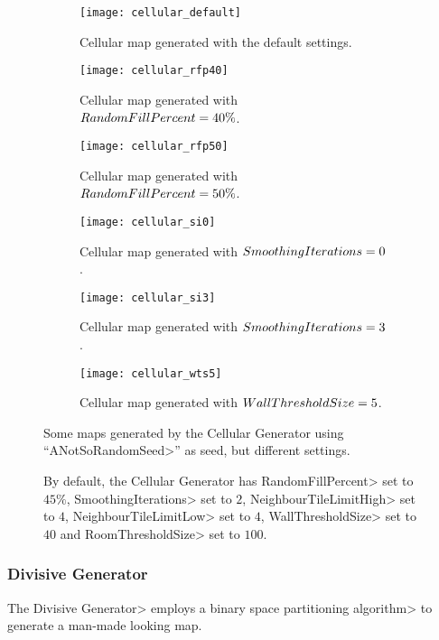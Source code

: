 \begin{figure}[tp]
	\centering
  	\begin{subfigure}[t]{0.325\linewidth}
		\texttt{[image: cellular\_default]}
     		\caption{Cellular map generated with the default settings.}
 	\end{subfigure}
  	\begin{subfigure}[t]{0.325\linewidth}
    		\texttt{[image: cellular\_rfp40]}
    		\caption{Cellular map generated with $Ran\-dom\-Fill\-Per\-cent = 40\%$.}
  	\end{subfigure}
  	\begin{subfigure}[t]{0.325\linewidth}
    		\texttt{[image: cellular\_rfp50]}
    		\caption{Cellular map generated with $Ran\-dom\-Fill\-Per\-cent = 50\%$.}
  	\end{subfigure}
  	\begin{subfigure}[t]{0.325\linewidth}
		\texttt{[image: cellular\_si0]}
     		\caption{Cellular map generated with $Smooth\-ing\-It\-er\-a\-tions = 0$.}
 	\end{subfigure}
  	\begin{subfigure}[t]{0.325\linewidth}
    		\texttt{[image: cellular\_si3]}
     		\caption{Cellular map generated with $Smooth\-ing\-It\-er\-a\-tions = 3$.}
  	\end{subfigure}
  	\begin{subfigure}[t]{0.325\linewidth}
    		\texttt{[image: cellular\_wts5]}
     		\caption{Cellular map generated with $Wall\-Thresh\-old\-Size = 5$.}
  	\end{subfigure}	
	\caption{Some maps generated by the Cellular Generator using ``\<ANotSoRandomSeed>'' as seed, but different settings.}
	\caption*{By default, the Cellular Generator has \<RandomFillPercent> set to $45\%$, \<SmoothingIterations> set to $2$,  \<NeighbourTileLimitHigh> set to $4$,  \<NeighbourTileLimitLow> set to $4$,  \<WallThresholdSize> set to $40$ and \<RoomThresholdSize> set to $100$.}
	\label{fig:cellulars}
\end{figure}


\subsubsection{Divisive Generator}\label{sssec:digger}

The \<Divisive Generator> employs a \<binary space partitioning algorithm> to generate a man-made looking map.

